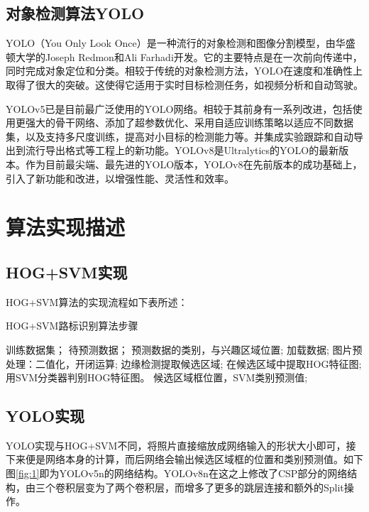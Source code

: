 \documentclass{article}
\begin{document}
\subsection{对象检测算法YOLO}
YOLO（You Only Look Once）\cite{ref9}是一种流行的对象检测和图像分割模型，由华盛顿大学的Joseph Redmon和Ali Farhadi开发。它的主要特点是在一次前向传递中，同时完成对象定位和分类。相较于传统的对象检测方法，YOLO在速度和准确性上取得了很大的突破。这使得它适用于实时目标检测任务，如视频分析和自动驾驶。

YOLOv5已是目前最广泛使用的YOLO网络。相较于其前身有一系列改进，包括使用更强大的骨干网络、添加了超参数优化、采用自适应训练策略以适应不同数据集，以及支持多尺度训练，提高对小目标的检测能力等。并集成实验跟踪和自动导出到流行导出格式等工程上的新功能。YOLOv8是Ultralytics的YOLO的最新版本。作为目前最尖端、最先进的YOLO版本，YOLOv8在先前版本的成功基础上，引入了新功能和改进，以增强性能、灵活性和效率。

\section{算法实现描述}
\subsection{HOG+SVM实现}
HOG+SVM算法的实现流程如下表所述：
\begin{algorithm}[H]
    \caption{ HOG+SVM路标识别算法步骤}
    \begin{algorithmic}[1]
        \Require
        训练数据集；
        待预测数据；
        \Ensure
        预测数据的类别，与兴趣区域位置;
        \State 加载数据;
        \State 图片预处理：二值化，开闭运算;
        \State 边缘检测提取候选区域;
        \State 在候选区域中提取HOG特征图;
        \State 用SVM分类器判别HOG特征图。
        \Return
        候选区域框位置，SVM类别预测值;
    \end{algorithmic}
\end{algorithm}


\subsection{YOLO实现}
YOLO实现与HOG+SVM不同，将照片直接缩放成网络输入的形状大小即可，接下来便是网络本身的计算，而后网络会输出候选区域框的位置和类别预测值。如下图\ref{fig:1}即为YOLOv5n的网络结构。YOLOv8n在这之上修改了CSP部分的网络结构，由三个卷积层变为了两个卷积层，而增多了更多的跳层连接和额外的Split操作。
\end{document}
